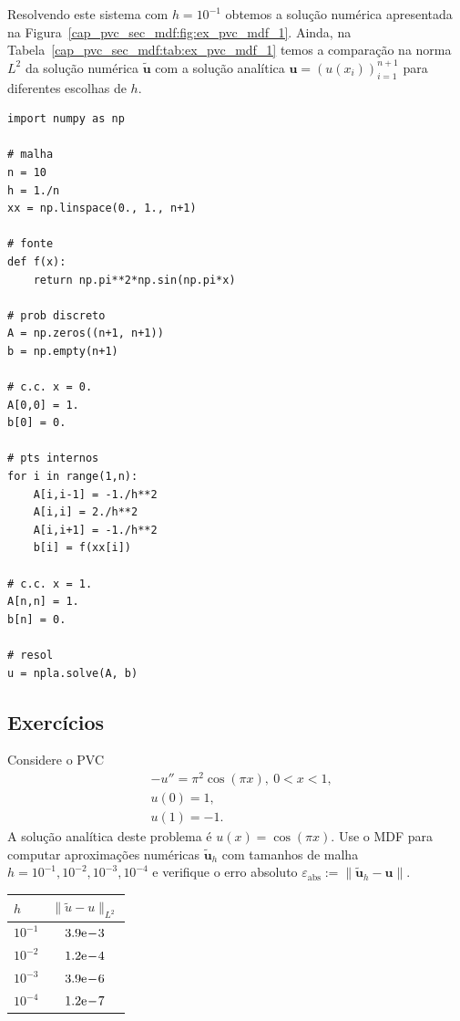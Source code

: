 \begin{ex}
Resolvendo este sistema com $h=10^{-1}$ obtemos a solução numérica apresentada na Figura~\ref{cap_pvc_sec_mdf:fig:ex_pvc_mdf_1}. Ainda, na Tabela~\ref{cap_pvc_sec_mdf:tab:ex_pvc_mdf_1} temos a comparação na norma $L^2$ da solução numérica $\tilde{\pmb{u}}$ com a solução analítica $\pmb{u} = (u(x_i))_{i=1}^{n+1}$ para diferentes escolhas de $h$.

\begin{lstlisting}[caption=pvc\_mdf.py]
import numpy as np

# malha
n = 10
h = 1./n
xx = np.linspace(0., 1., n+1)

# fonte
def f(x):
    return np.pi**2*np.sin(np.pi*x)

# prob discreto
A = np.zeros((n+1, n+1))
b = np.empty(n+1)

# c.c. x = 0.
A[0,0] = 1.
b[0] = 0.

# pts internos
for i in range(1,n):
    A[i,i-1] = -1./h**2
    A[i,i] = 2./h**2
    A[i,i+1] = -1./h**2
    b[i] = f(xx[i])

# c.c. x = 1.
A[n,n] = 1.
b[n] = 0.

# resol
u = npla.solve(A, b)
\end{lstlisting}
\end{ex}

\subsection{Exercícios}

\begin{exer}
  Considere o PVC
  \begin{align}
    &-u'' = \pi^2\cos(\pi x), ~0 < x < 1,\\
    &u(0) = 1,\\
    &u(1) = -1.
  \end{align}
  A solução analítica deste problema é $u(x) = \cos(\pi x)$. Use o MDF para computar aproximações numéricas $\tilde{\pmb{u}}_h$ com tamanhos de malha $h=10^{-1}, 10^{-2}, 10^{-3}, 10^{-4}$ e verifique o erro absoluto $\varepsilon_{\text{abs}} := \|\tilde{\pmb{u}}_h - \pmb{u}\|$.
\end{exer}
\begin{resp}
  \begin{tabular}{l|c}\toprule
    $h$ & $\|\tilde{u} - u\|_{L^2}$ \\\midrule
    $10^{-1}$ & $3.9\mathrm{e}\!-\!3$\\
    $10^{-2}$ & $1.2\mathrm{e}\!-\!4$\\
    $10^{-3}$ & $3.9\mathrm{e}\!-\!6$\\
    $10^{-4}$ & $1.2\mathrm{e}\!-\!7$\\\bottomrule
  \end{tabular}  
\end{resp}

